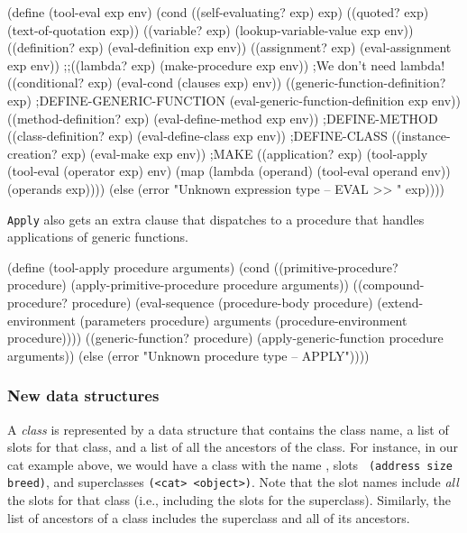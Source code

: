 \beginlisp
(define (tool-eval exp env)
  (cond ((self-evaluating? exp) exp)
        ((quoted? exp) (text-of-quotation exp))
        ((variable? exp) (lookup-variable-value exp env))
        ((definition? exp) (eval-definition exp env))
        ((assignment? exp) (eval-assignment exp env))
        ;;((lambda? exp) (make-procedure exp env))      ;We don't need lambda!
        ((conditional? exp) (eval-cond (clauses exp) env))
        ((generic-function-definition? exp)               ;DEFINE-GENERIC-FUNCTION
         (eval-generic-function-definition exp env))
        ((method-definition? exp) (eval-define-method exp env)) ;DEFINE-METHOD
        ((class-definition? exp) (eval-define-class exp env))     ;DEFINE-CLASS
        ((instance-creation? exp) (eval-make exp env))          ;MAKE
        ((application? exp)
         (tool-apply (tool-eval (operator exp) env)
                     (map (lambda (operand) (tool-eval operand env))
                          (operands exp))))
        (else (error "Unknown expression type -- EVAL >> " exp))))
\endlisp

{\tt Apply} also gets an extra clause that dispatches to a
procedure that handles applications of generic functions.


\beginlisp
(define (tool-apply procedure arguments)
  (cond ((primitive-procedure? procedure)
         (apply-primitive-procedure procedure arguments))
        ((compound-procedure? procedure)
         (eval-sequence
          (procedure-body procedure)
          (extend-environment (parameters procedure)
                              arguments
                              (procedure-environment procedure))))
        ((generic-function? procedure)
         (apply-generic-function procedure arguments))
        (else (error "Unknown procedure type -- APPLY"))))
\endlisp

\subsubsection{New data structures}

A {\it class} is represented by a data structure that contains the
class name, a list of slots for that class, and a list of all the
ancestors of the class.  For instance, in our cat example above, we
would have a class with the name {\tt <house-cat>}, slots {\tt
(address size breed)}, and superclasses {\tt (<cat> <object>)}.  Note
that the slot names include {\it all} the slots for that class (i.e.,
including the slots for the superclass).  Similarly, the list of
ancestors of a class includes the superclass and all of its ancestors.

